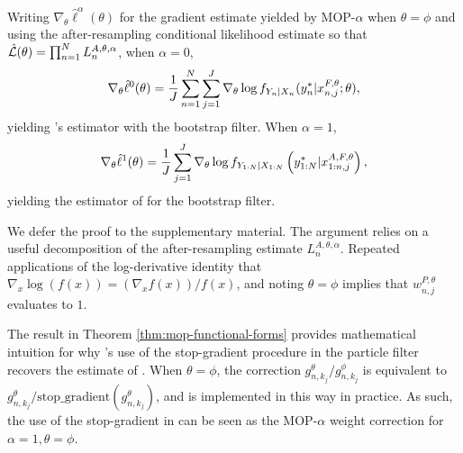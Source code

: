 \documentclass[numsec,webpdf,modern,medium,namedate]{oup-authoring-template}
\newcommand\arxiv[2]{#2} %
\theoremstyle{thmstyleone}%
\theoremstyle{thmstyletwo}%
\theoremstyle{thmstylethree}%
\begin{document}
\begin{thm}
    \label{thm:mop-functional-forms}
    Writing $\nabla_\theta \hat\ell^\alpha(\theta)$ for the gradient estimate yielded by MOP-$\alpha$ when $\theta=\phi$ and using the after-resampling conditional likelihood estimate so that $\hat{\mathcal{L}}(\theta) = \prod_{n=1}^N L_n^{A, \theta, \alpha}$, when $\alpha=0$,
    \vspace*{-2.5mm}
    \begin{equation} \nonumber
        \nabla_\theta \hat\ell^0(\theta) 
        = \frac{1}{J} \sum_{n=1}^N \sum_{j=1}^J \nabla_\theta \log f_{Y_n|X_{n}}(y_n^*|x_{n,j}^{F, \theta}; \theta),
        \vspace*{-2.5mm}
    \end{equation}
    yielding \cite{naesseth18}'s estimator with the bootstrap filter. When $\alpha=1$,
    \vspace*{-2.5mm}
    \begin{equation} \nonumber
        \nabla_\theta \hat{\ell}^1(\theta) 
        = \frac{1}{J}\sum_{j=1}^J \nabla_\theta \log f_{Y_{1:N}|X_{1:N}}\left(y_{1:N}^* | x_{1:n,j}^{A, F,\theta}\right),
    \vspace*{-2.5mm}
    \end{equation}
    yielding the estimator of \cite{poyiadjis11} for the bootstrap filter.
\end{thm}

We defer the proof to \arxiv{Appendix~\ref{appendix:functional}}{the supplementary material}. 
The argument relies on a useful decomposition of the after-resampling estimate $L_n^{A,\theta,\alpha}$. 
Repeated applications of the log-derivative identity that $\nabla_x \log(f(x)) = (\nabla_x f(x))/f(x)$, and noting $\theta=\phi$ implies that $w_{n,j}^{P,\theta}$ evaluates to $1$. 

The result in Theorem \ref{thm:mop-functional-forms} provides mathematical intuition for why \cite{scibior21}'s use of the stop-gradient procedure in the particle filter recovers the estimate of \cite{poyiadjis11}. When $\theta=\phi$, the correction $g_{n,k_j}^\theta/g_{n,k_j}^\phi$ is equivalent to $g_{n,k_j}^\theta / \text{stop\_gradient}(g_{n,k_j}^\theta)$, and is implemented in this way in practice. As such, the use of the stop-gradient in \cite{scibior21} can be seen as the MOP-$\alpha$ weight correction for $\alpha=1, \theta=\phi$.

\end{document}
